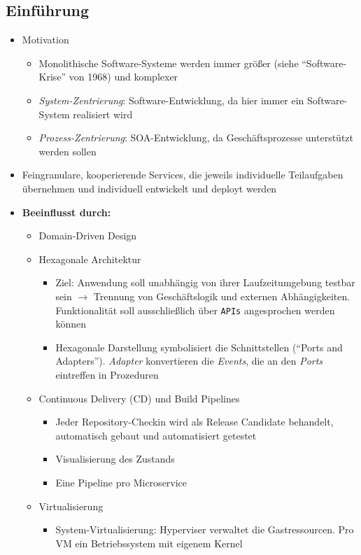 \subsection{Einführung}
\begin{itemize}
	\item Motivation
	\begin{itemize}
		\item Monolithische Software-Systeme werden immer größer (siehe "`Software-Krise"' von 1968) und komplexer
		\item \textit{System-Zentrierung}: Software-Entwicklung, da hier immer ein Software-System realisiert wird
		\item \textit{Prozess-Zentrierung}: SOA-Entwicklung, da Geschäftsprozesse unterstützt werden sollen
	\end{itemize}
	\item Feingranulare, kooperierende Services, die jeweils individuelle Teilaufgaben übernehmen und individuell entwickelt und deployt werden
	\item \textbf{Beeinflusst durch:}
	\begin{itemize}
		\item Domain-Driven Design
		\item Hexagonale Architektur
		\begin{itemize}
			\item Ziel: Anwendung soll unabhängig von ihrer Laufzeitumgebung testbar sein \(\rightarrow\) Trennung von Geschäftslogik und externen Abhängigkeiten. Funktionalität soll ausschließlich über \texttt{APIs} angesprochen werden können
			\item Hexagonale Darstellung symbolisiert die Schnittstellen ("`Ports and Adapters"'). \textit{Adapter} konvertieren die \textit{Events}, die an den \textit{Ports} eintreffen in Prozeduren
		\end{itemize}
		\item Continuous Delivery (CD) und Build Pipelines
		\begin{itemize}
			\item Jeder Repository-Checkin wird als Release Candidate behandelt, automatisch gebaut und automatisiert getestet
			\item Visualisierung des Zustands
			\item Eine Pipeline pro Microservice
		\end{itemize}
		\item Virtualisierung
		\begin{itemize}
			\item System-Virtualisierung: Hyperviser verwaltet die Gastressourcen. Pro VM ein Betriebssystem mit eigenem Kernel

\end{itemize}
\end{itemize}
\end{itemize}
